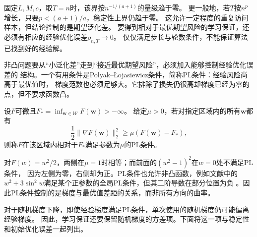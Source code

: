 固定$L,M,c$，取$T=n$时，该界按$n^{-1/(a+1)}$的量级趋于零。
更一般地，若$T$按$n^p$增长，只要$p<(a+1)/a$，稳定性上界仍趋于零。
这允许一定程度的重复访问样本，但结论控制的是期望泛化差。
要得到相对于最优期望风险的学习保证，还必须有相应的经验优化误差$\rho_{n,T}\to0$。
仅仅满足步长与轮数条件，不能保证算法已找到好的经验解。

非凸问题要从“小泛化差”走到“接近最优期望风险”，必须加入能够控制经验优化误差的
结构。一个有用条件是Polyak--\L{}ojasiewicz条件，简称PL条件：经验风险尚高于最优值时，
梯度范数也必须足够大。它排除了损失仍很高却梯度已经为零的点，但不要求函数凸。

\begin{definition}[PL条件]
\label{def:pl-condition}
设$F$可微且$F_* =\inf_{\bm w\in\mathcal W}F(\bm w)>-\infty$。
给定$\mu>0$，若对指定区域内的所有$\bm w$都有
\[
 \frac12\|\nabla F(\bm w)\|_2^2\geq\mu(F(\bm w)-F_*),
\]
则称$F$在该区域内相对于$F_*$满足参数为$\mu$的PL条件。
\end{definition}

对$F(w)=w^2/2$，两侧在$\mu=1$时相等；而前面的$(w^2-1)^2$在$w=0$处不满足PL条件，
因为左侧为零，右侧却为正。PL条件也允许非凸函数，例如文献中的
$w^2+3\sin^2w$满足某个正参数的全局PL条件，但其二阶导数在部分位置为负
。因此PL条件控制的是梯度与最优值差距的关系，而非所有方向的曲率。

对于随机梯度下降，即使经验梯度满足PL条件，单次使用的随机梯度仍可能偏离经验梯度。
因此，学习保证还要保留随机梯度的方差项。下面将这一项与稳定性和初始优化误差一起列出。

